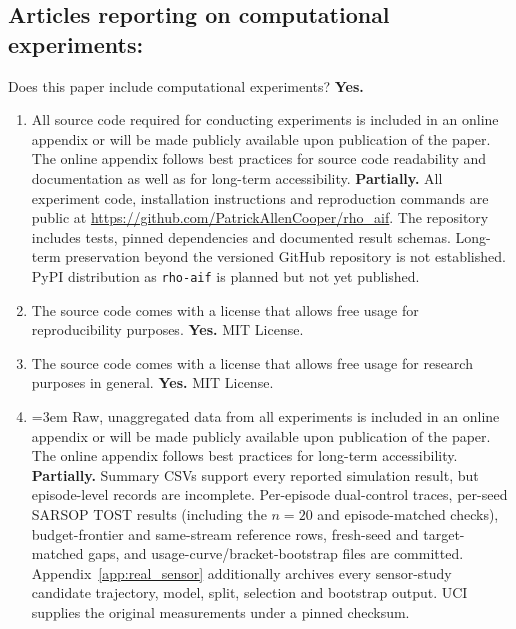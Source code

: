 \documentclass[manuscript, screen, review]{jair}
\begin{document}
\subsection*{Articles reporting on computational experiments:}
Does this paper include computational experiments? \textbf{Yes.}
\begin{enumerate}
\item All source code required for conducting experiments is included in an online appendix or will be made publicly available upon publication of the paper. The online appendix follows best practices for source code readability and documentation as well as for long-term accessibility. \textbf{Partially.} All experiment code, installation instructions and reproduction commands are public at \url{https://github.com/PatrickAllenCooper/rho_aif}. The repository includes tests, pinned dependencies and documented result schemas. Long-term preservation beyond the versioned GitHub repository is not established. PyPI distribution as \texttt{rho-aif} is planned but not yet published.
\item The source code comes with a license that allows free usage for reproducibility purposes. \textbf{Yes.} MIT License.
\item The source code comes with a license that allows free usage for research purposes in general. \textbf{Yes.} MIT License.
\item {\emergencystretch=3em Raw, unaggregated data from all experiments is included in an online appendix or will be made publicly available upon publication of the paper. The online appendix follows best practices for long-term accessibility. \textbf{Partially.} Summary CSVs support every reported simulation result, but episode-level records are incomplete. Per-episode dual-control traces, per-seed SARSOP TOST results (including the $n{=}20$ and episode-matched checks), budget-frontier and same-stream reference rows, fresh-seed and target-matched gaps, and usage-curve/bracket-bootstrap files are committed. Appendix~\ref{app:real_sensor} additionally archives every sensor-study candidate trajectory, model, split, selection and bootstrap output. UCI supplies the original measurements under a pinned checksum.

}
\end{enumerate}
\end{document}
